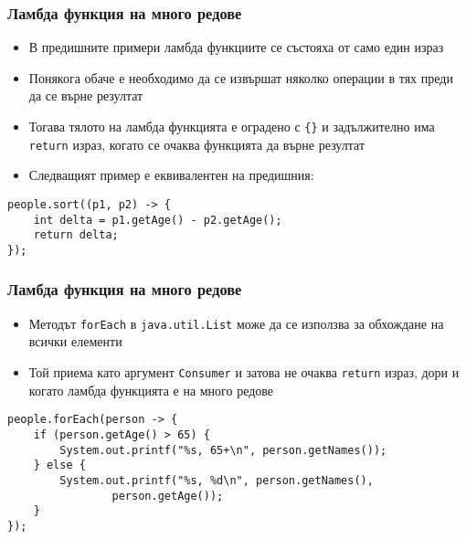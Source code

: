 \documentclass[ignorenonframetext, hyperref=unicode,compress,pdflatex]{beamer}
\begin{document}
\begin{frame}[containsverbatim]\frametitle{Ламбда функция на много редове}
\begin{itemize}
  \item В предишните примери ламбда функциите се състояха от само един израз
  \item Понякога обаче е необходимо да се извършат няколко операции в тях преди
  да се върне резултат
  \item Тогава тялото на ламбда функцията е оградено с
  \lstinline[mathescape]!{}! и задължително има \lstinline{return} израз, когато
  се очаква функцията да върне резултат
  \item Следващият пример е еквивалентен на предишния:
\end{itemize}
\begin{lstlisting}
people.sort((p1, p2) -> {
	int delta = p1.getAge() - p2.getAge();
	return delta;
});
\end{lstlisting}
\end{frame}

\begin{frame}[containsverbatim]\frametitle{Ламбда функция на много редове}
\begin{itemize}
  \item Методът \lstinline{forEach} в \lstinline{java.util.List} може да се
  използва за обхождане на всички елементи
  \item Той приема като аргумент \lstinline{Consumer} и затова не очаква
  \lstinline{return} израз, дори и когато ламбда функцията е на много редове
\end{itemize}
\begin{lstlisting}
people.forEach(person -> {
	if (person.getAge() > 65) {
		System.out.printf("%s, 65+\n", person.getNames());
	} else {
		System.out.printf("%s, %d\n", person.getNames(),
				person.getAge());
	}
});
\end{lstlisting}
\end{frame}
\end{document}
